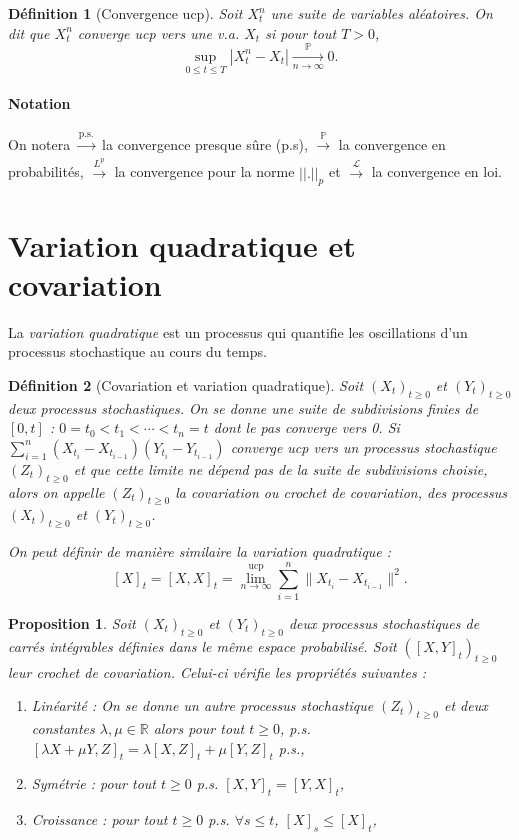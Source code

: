 \documentclass[openany]{book}
\renewcommand{\P}{\mathds{P}}
\newcommand{\R}{\mathbb{R}}
\newcommand{\1}{\mathbbm{1}}
\theoremstyle{thmfont}
\theoremstyle{deffont}
\newtheorem{definition}[definition]{Définition}
\theoremstyle{thmfont}
\newtheorem{prop}[prop]{Proposition}
\theoremstyle{deffont}
\begin{document}
  \begin{definition}[Convergence ucp] Soit $X_t^n$ une suite de variables aléatoires. On dit que $X_t^n$ \textit{converge ucp} vers une v.a. $X_t$ si pour tout $T >0$, 
    $$\underset{0 \leq t \leq T}{\sup}|X_t^n - X_t| \xrightarrow[n \to \infty]{\P} 0.$$
  \end{definition}

  \paragraph{Notation}
  On notera $\xrightarrow[]{\text{p.s.}}$ la convergence presque sûre (p.s), $\xrightarrow[]{\P}$ la convergence en probabilités, $\xrightarrow[]{L^p}$ la convergence pour la norme $||.||_p$ et $\xrightarrow[]{\mathcal L}$ la convergence en loi.
    
\section{Variation quadratique et covariation}

La \textit{variation quadratique} est un processus qui quantifie les oscillations d'un processus stochastique au cours du temps. %

\begin{definition}[Covariation et variation quadratique] Soit $(X_t)_{t\geq0}$ et $(Y_t)_{t\geq0}$ deux processus stochastiques. 
  On se donne une suite de subdivisions finies de $[0,t]$ : $0 = t_0 < t_1 < \cdots < t_n = t$ dont le pas converge vers 0. Si $\sum_{i = 1}^n(X_{t_i} - X_{t_{i-1}})(Y_{t_i} - Y_{t_{i-1}})$ converge ucp vers un processus stochastique $(Z_t)_{t\geq0}$ et que cette limite ne dépend pas de la suite de subdivisions choisie, alors on appelle $(Z_t)_{t\geq0}$ la \textit{covariation} ou \textit{crochet de covariation}, des processus $(X_t)_{t\geq0}$ et $(Y_t)_{t\geq0}$.

 \noindent On peut définir de manière similaire la \textit{variation quadratique} :
 $$[X]_t = [X,X]_t = \lim_{n\to \infty}^{\text{ucp}} \sum_{i = 1}^n\|X_{t_i} - X_{t_{i-1}}\|^2.$$
\label{def:crochet}
\end{definition}


\begin{prop} Soit $(X_t)_{t\geq0}$ et $(Y_t)_{t\geq0}$ deux processus stochastiques de carrés intégrables définies dans le même espace probabilisé. Soit $([X,Y]_t)_{t\geq0}$ leur crochet de covariation. Celui-ci vérifie les propriétés suivantes : 
  \begin{enumerate}
  \item Linéarité : On se donne un autre processus stochastique $(Z_t)_{t\geq0}$ et deux constantes $\lambda, \mu \in \R$ alors pour tout $t\geq0$, p.s. $[\lambda X + \mu Y, Z]_t = \lambda[X,Z]_t + \mu[Y,Z]_t$ p.s.,
  \item Symétrie : pour tout $t\geq0$ p.s. $[X,Y]_t = [Y,X]_t$,
  \item Croissance : pour tout $t\geq0$ p.s. $\forall s\leq t$, $[X]_s \leq [X]_t$,
  \end{enumerate}
\end{prop}
\end{document}
